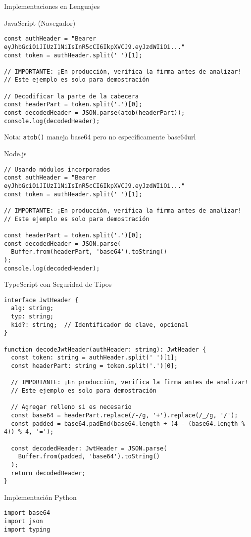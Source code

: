 \documentclass[presentation,aspectratio=169]{beamer}
\begin{document}
\begin{frame}[label={sec:orga7e0c44},fragile]{Implementaciones en Lenguajes}
 \begin{block}{JavaScript (Navegador) 🧩}
\begin{verbatim}
const authHeader = "Bearer eyJhbGciOiJIUzI1NiIsInR5cCI6IkpXVCJ9.eyJzdWIiOi..."
const token = authHeader.split(' ')[1];

// IMPORTANTE: ¡En producción, verifica la firma antes de analizar!
// Este ejemplo es solo para demostración

// Decodificar la parte de la cabecera
const headerPart = token.split('.')[0];
const decodedHeader = JSON.parse(atob(headerPart));
console.log(decodedHeader);
\end{verbatim}

\alert{Nota}: \texttt{atob()} maneja base64 pero no específicamente base64url
\end{block}
\begin{block}{Node.js 🧩}
\begin{verbatim}
// Usando módulos incorporados
const authHeader = "Bearer eyJhbGciOiJIUzI1NiIsInR5cCI6IkpXVCJ9.eyJzdWIiOi..."
const token = authHeader.split(' ')[1];

// IMPORTANTE: ¡En producción, verifica la firma antes de analizar!
// Este ejemplo es solo para demostración

const headerPart = token.split('.')[0];
const decodedHeader = JSON.parse(
  Buffer.from(headerPart, 'base64').toString()
);
console.log(decodedHeader);
\end{verbatim}
\end{block}
\begin{block}{TypeScript con Seguridad de Tipos 🧩}
\begin{verbatim}
interface JwtHeader {
  alg: string;
  typ: string;
  kid?: string;  // Identificador de clave, opcional
}

function decodeJwtHeader(authHeader: string): JwtHeader {
  const token: string = authHeader.split(' ')[1];
  const headerPart: string = token.split('.')[0];

  // IMPORTANTE: ¡En producción, verifica la firma antes de analizar!
  // Este ejemplo es solo para demostración

  // Agregar relleno si es necesario
  const base64 = headerPart.replace(/-/g, '+').replace(/_/g, '/');
  const padded = base64.padEnd(base64.length + (4 - (base64.length % 4)) % 4, '=');

  const decodedHeader: JwtHeader = JSON.parse(
    Buffer.from(padded, 'base64').toString()
  );
  return decodedHeader;
}
\end{verbatim}
\end{block}
\begin{block}{Implementación Python 🧩}
\begin{verbatim}
import base64
import json
import typing


\end{verbatim}
\end{block}
\end{frame}
\end{document}
